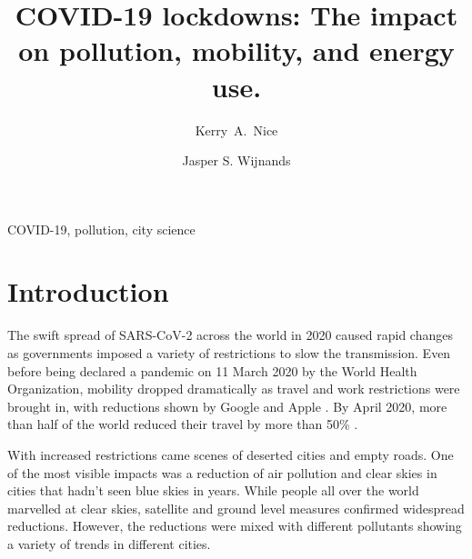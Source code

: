 \documentclass[final,3p,times,authoryear]{elsarticle}
\begin{document}

\title{COVID-19 lockdowns: The impact on pollution, mobility, and energy use.}

\author[melb]{Kerry~A.~Nice}
\author[melb]{Jasper S. Wijnands}
\address[melb]{Transport, Health, and Urban Design Hub, Faculty of Architecture, Building, and Planning, University of Melbourne, Australia.}






\begin{abstract}

\end{abstract}

\begin{keyword}
COVID-19\sep 
pollution\sep
city science
\end{keyword}



\maketitle

\section{Introduction}

The swift spread of SARS-CoV-2 across the world in 2020 caused rapid changes as governments imposed a variety of restrictions to slow the transmission. Even before being declared a pandemic on 11 March 2020 by the World Health Organization, mobility dropped dramatically as travel and work restrictions were brought in, with reductions shown by Google and Apple \citep{Google2020,Apple2020}. By April 2020, more than half of the world reduced their travel by more than 50\% \citep{LeQuere2020,Forster2020}.

With increased restrictions came scenes of deserted cities and empty roads. One of the most visible impacts was a reduction of air pollution and clear skies in cities that hadn't seen blue skies in years. While people all over the world marvelled at clear skies, satellite and ground level measures confirmed widespread reductions\citep{Liu2020c}. However, the reductions were mixed with different pollutants showing a variety of trends in different cities. 
\end{document}
